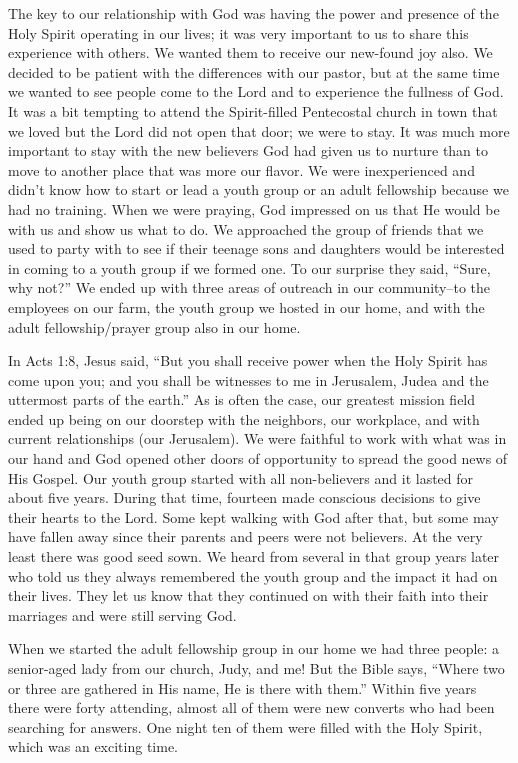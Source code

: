\documentclass[oneside]{book}
\begin{document}
The key to our relationship with God was having the power and presence of the Holy Spirit operating in our lives; it was very important to us to share this experience with others. We wanted them to receive our new-found joy also. We decided to be patient with the differences with our pastor, but at the same time we wanted to see people come to the Lord and to experience the fullness of God. It was a bit tempting to attend the Spirit-filled Pentecostal church in town that we loved but the Lord did not open that door; we were to stay. It was much more important to stay with the new believers God had given us to nurture than to move to another place that was more our flavor. We were inexperienced and didn’t know how to start or lead a youth group or an adult fellowship because we had no training. When we were praying, God impressed on us that He would be with us and show us what to do. We approached the group of friends that we used to party with to see if their teenage sons and daughters would be interested in coming to a youth group if we formed one. To our surprise they said, “Sure, why not?” We ended up with three areas of outreach in our community--to the employees on our farm, the youth group we hosted in our home, and with the adult fellowship/prayer group also in our home.

In Acts 1:8, Jesus said, “But you shall receive power when the Holy Spirit has come upon you; and you shall be witnesses to me in Jerusalem, Judea and the uttermost parts of the earth.” As is often the case, our greatest mission field ended up being on our doorstep with the neighbors, our workplace, and with current relationships (our Jerusalem). We were faithful to work with what was in our hand and God opened other doors of opportunity to spread the good news of His Gospel. Our youth group started with all non-believers and it lasted for about five years. During that time, fourteen made conscious decisions to give their hearts to the Lord. Some kept walking with God after that, but some may have fallen away since their parents and peers were not believers. At the very least there was good seed sown. We heard from several in that group years later who told us they always remembered the youth group and the impact it had on their lives. They let us know that they continued on with their faith into their marriages and were still serving God.

When we started the adult fellowship group in our home we had three people: a senior-aged lady from our church, Judy, and me! But the Bible says, “Where two or three are gathered in His name, He is there with them.” Within five years there were forty attending, almost all of them were new converts who had been searching for answers. One night ten of them were filled with the Holy Spirit, which was an exciting time. 
\end{document}
